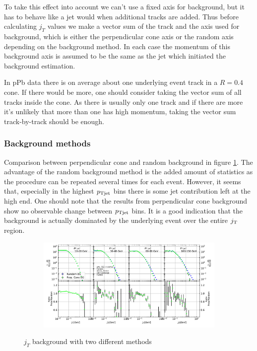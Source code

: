 To take this effect into account we can't use a fixed axis for background, but it has to behave like a jet would when additional tracks are added. Thus before calculating $j_T$ values we make a vector sum of the track and the axis used for background, which is either the perpendicular cone axis or the random axis depending on the background method. In each case the momentum of this background axis is assumed to be the same as the jet which initiated the background estimation.

In pPb data there is on average about one underlying event track in a $R = 0.4$ cone. If there would be more, one should consider taking the vector sum of all tracks inside the cone. As there is usually only one track and if there are more it's unlikely that more than one has high momentum, taking the vector sum track-by-track should be enough.






\subsubsection{Background methods}
Comparison between perpendicular cone and random background in figure \ref{fig:bgcomparison}. The advantage of the random background method is the added amount of statistics as the procedure can be repeated several times for each event. However, it seems that, especially in the highest $p_{\rm Tjet}$ bins there is some jet contribution left at the high end. One should note that the results from perpendicular cone background show no observable change between $p_{\rm Tjet}$ bins. It is a good indication that the background is actually dominated by the underlying event over the entire $j_{\rm T}$ region. 
\begin{figure}
\centering
\begin{subfigure}{0.95\textwidth}
\includegraphics[width=\textwidth]{results/MixedFullJetsR04BackgroundComparison.pdf}
\end{subfigure}
\caption{$j_T$ background with two different methods}
\label{fig:bgcomparison}
\end{figure}


